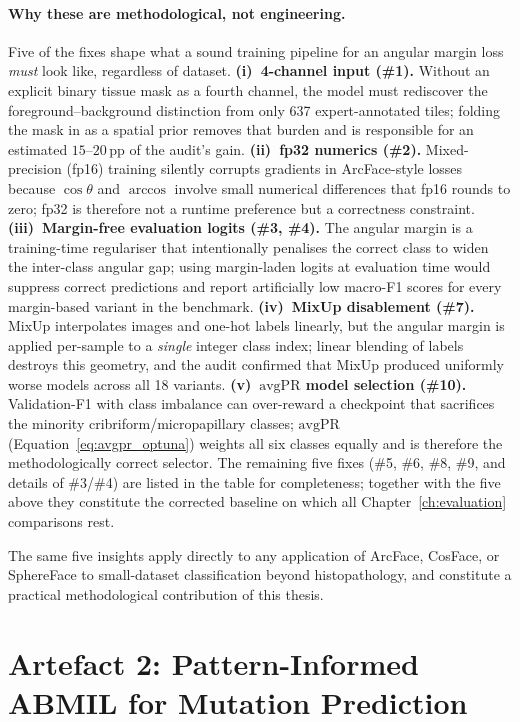 \paragraph{Why these are methodological, not engineering.}
Five of the fixes shape what a sound training pipeline for an angular
margin loss \emph{must} look like, regardless of dataset.
\textbf{(i)~4-channel input (\#1).}
Without an explicit binary tissue mask as a fourth channel, the model
must rediscover the foreground--background distinction from only 637
expert-annotated tiles; folding the mask in as a spatial prior
removes that burden and is responsible for an estimated $15$--$20$\,pp
of the audit's gain.
\textbf{(ii)~fp32 numerics (\#2).}
Mixed-precision (fp16) training silently corrupts gradients in
ArcFace-style losses because $\cos\theta$ and $\arccos$ involve small
numerical differences that fp16 rounds to zero;
fp32 is therefore not a runtime preference but a correctness
constraint.
\textbf{(iii)~Margin-free evaluation logits (\#3, \#4).}
The angular margin is a training-time regulariser that intentionally
penalises the correct class to widen the inter-class angular gap;
using margin-laden logits at evaluation time would suppress correct
predictions and report artificially low macro-F1 scores for every
margin-based variant in the benchmark.
\textbf{(iv)~MixUp disablement (\#7).}
MixUp interpolates images and one-hot labels linearly, but the angular
margin is applied per-sample to a \emph{single} integer class index;
linear blending of labels destroys this geometry, and the audit
confirmed that MixUp produced uniformly worse models across all 18
variants.
\textbf{(v)~$\mathrm{avgPR}$ model selection (\#10).}
Validation-F1 with class imbalance can over-reward a checkpoint that
sacrifices the minority cribriform/micropapillary classes;
$\mathrm{avgPR}$ (Equation~\ref{eq:avgpr_optuna}) weights all six
classes equally and is therefore the methodologically correct
selector.
The remaining five fixes (\#5, \#6, \#8, \#9, and details of \#3/\#4)
are listed in the table for completeness; together with the five
above they constitute the corrected baseline on which all
Chapter~\ref{ch:evaluation} comparisons rest.

The same five insights apply directly to any application of ArcFace,
CosFace, or SphereFace to small-dataset classification beyond
histopathology, and constitute a practical methodological contribution
of this thesis.


\section{Artefact 2: Pattern-Informed ABMIL for Mutation Prediction}
\label{sec:meth:mutation_prediction}

